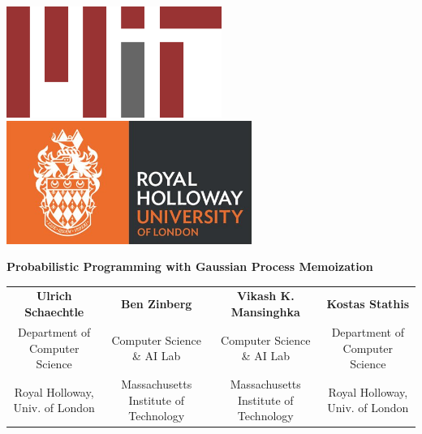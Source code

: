 \documentclass[a0,portrait]{a0poster}
\begin{document}

\begin{flushright}
\begin{minipage}[b]{0.25\linewidth}
\includegraphics[width=7cm]{mitlogo.png}
\hspace{1cm}
\includegraphics[width=8cm]{royalhollowaylogo.jpg}
\end{minipage} 
\end{flushright}

\vspace{2cm}

\begin{center}
\addtolength{\tabcolsep}{20pt} 
\veryHuge \textbf{Probabilistic Programming with Gaussian Process Memoization} \color{Black}\\[1.5cm] %
 \Large   \begin{tabular}{  c  c  c c}
           \textbf{Ulrich Schaechtle}  & \textbf{Ben Zinberg} & \textbf{Vikash K. Mansinghka} & \textbf{Kostas Stathis}\\ 
           Department of Computer Science & Computer Science \& AI Lab & Computer Science \& AI Lab & Department of Computer Science \\
           Royal Holloway, Univ. of London & Massachusetts Institute of Technology & Massachusetts Institute of Technology & Royal Holloway, Univ. of London \\
        \end{tabular}

\addtolength{\tabcolsep}{-2pt} 
\end{center}
\end{document}
